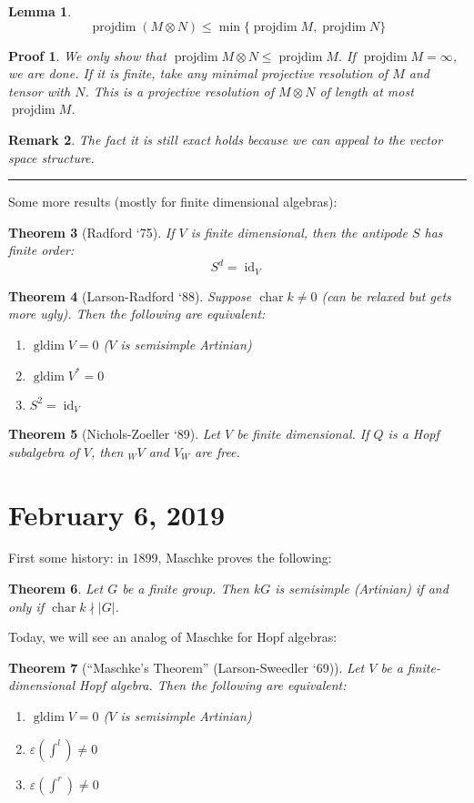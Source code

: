 \documentclass[12pt]{article}
\theoremstyle{break}
\theoremstyle{nonumberbreak}
\theoremstyle{changebreak}
\newtheorem{thm}{Theorem}[subsection]
\newtheorem{lem}[thm]{Lemma}
\theoremstyle{break}
\theoremstyle{nonumberbreak}
\newtheorem{prf}{Proof}
\theoremstyle{nonumberplain}
\theoremstyle{change}
\newtheorem{rmk}[thm]{Remark}
\newcommand*{\brk}{
\rule{2in}{.1pt}
}
\DeclareMathOperator{\gldim}{gldim}
\DeclareMathOperator{\projdim}{projdim}
\DeclareMathOperator{\ch}{char}
\DeclareMathOperator{\id}{id}
\begin{document}
\begin{lem}\label{lem-tensorproj}
	\[\projdim(M\otimes N)\le \min\{\projdim M,\projdim N\}\]
\end{lem}
\begin{prf}
	We only show that $\projdim M\otimes N\le \projdim M$. If $\projdim M=\infty$, we are done.
	If it is finite, take any minimal projective resolution of $M$ and tensor with $N$. This is a projective 
	resolution of $M\otimes N$ of length at most $\projdim M$. 
\end{prf}
\begin{rmk}
	The fact it is still exact holds because we can appeal to the vector space structure.
\end{rmk}

\brk

Some more results (mostly for finite dimensional algebras):
\begin{thm}[Radford `75]
	If $V$ is finite dimensional, then the antipode $S$ has finite order:
	\[S^d=\id_V\]
\end{thm}
\begin{thm}[Larson-Radford `88]
	Suppose $\ch k\ne 0$ (can be relaxed but gets more ugly). Then the following are equivalent:
	\begin{enumerate}
		\item $\gldim V=0$ ($V$ is semisimple Artinian)
		\item $\gldim V^*=0$
		\item $S^2=\id_V$
	\end{enumerate}
\end{thm}
\begin{thm}[Nichols-Zoeller `89]
	Let $V$ be finite dimensional. If $Q$ is a Hopf subalgebra of $V$, then $_WV$ and $V_W$ are free.
\end{thm}

\section{February 6, 2019}
First some history: in 1899, Maschke proves the following:
\begin{thm}
	Let $G$ be a finite group. Then $kG$ is semisimple (Artinian) if and only if $\ch k\nmid |G|$.
\end{thm}
Today, we will see an analog of Maschke for Hopf algebras:
\begin{thm}[``Maschke's Theorem'' (Larson-Sweedler `69)]
	Let $V$ be a finite-dimensional Hopf algebra. Then the following are equivalent:
	\begin{enumerate}
		\item $\gldim V = 0$ ($V$ is semisimple Artinian)
		\item $\varepsilon(\int^l)\ne 0$
		\item $\varepsilon(\int^r)\ne 0$
	\end{enumerate}
\end{thm}
\end{document}
